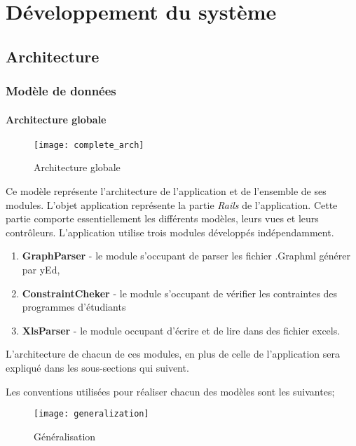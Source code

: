 \chapter{Développement du système}
\label{developpement_system}
\section{Architecture}
\subsection{Modèle de données}

\subsubsection{Architecture globale}

\begin{figure}[H]
\caption{Architecture globale}
\centering
\label{fig:complete_arch}
\texttt{[image: complete\_arch]}
\end{figure}

Ce modèle représente l'architecture de l'application et de l'ensemble de ses modules. L'objet application représente la partie \textit{Rails} de l'application. Cette partie comporte essentiellement les différents modèles, leurs vues et leurs contrôleurs. L'application utilise trois modules développés indépendamment.
\begin{enumerate}
  \item \textbf{GraphParser} - le module s'occupant de parser les fichier .Graphml générer par yEd, 
  \item \textbf{ConstraintCheker} - le module s'occupant de vérifier les contraintes des programmes d'étudiants
  \item \textbf{XlsParser} - le module occupant d'écrire et de lire dans des fichier excels. 
\end{enumerate}

L'architecture de chacun de ces modules, en plus de celle de l'application sera expliqué dans les sous-sections qui suivent.

Les conventions utilisées pour réaliser chacun des modèles sont les suivantes; 

\begin{figure}[H]
\centering
\caption{Généralisation}
\label{fig:generalization}
\texttt{[image: generalization]}
\end{figure}

